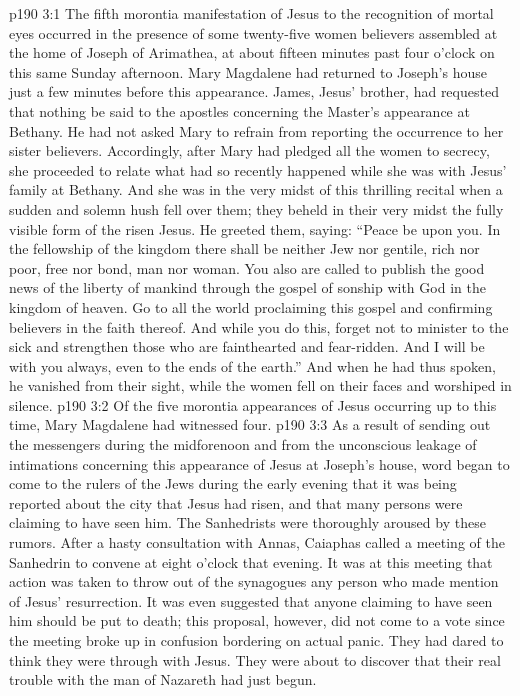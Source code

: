 \vs p190 3:1 The fifth morontia manifestation of Jesus to the recognition of mortal eyes occurred in the presence of some twenty\hyp{}five women believers assembled at the home of Joseph of Arimathea, at about fifteen minutes past four o’clock on this same Sunday afternoon. Mary Magdalene had returned to Joseph’s house just a few minutes before this appearance. James, Jesus’ brother, had requested that nothing be said to the apostles concerning the Master’s appearance at Bethany. He had not asked Mary to refrain from reporting the occurrence to her sister believers. Accordingly, after Mary had pledged all the women to secrecy, she proceeded to relate what had so recently happened while she was with Jesus’ family at Bethany. And she was in the very midst of this thrilling recital when a sudden and solemn hush fell over them; they beheld in their very midst the fully visible form of the risen Jesus. He greeted them, saying: \textcolor{ubdarkred}{“Peace be upon you. In the fellowship of the kingdom there shall be neither Jew nor gentile, rich nor poor, free nor bond, man nor woman. You also are called to publish the good news of the liberty of mankind through the gospel of sonship with God in the kingdom of heaven. Go to all the world proclaiming this gospel and confirming believers in the faith thereof. And while you do this, forget not to minister to the sick and strengthen those who are fainthearted and fear\hyp{}ridden. And I will be with you always, even to the ends of the earth.”} And when he had thus spoken, he vanished from their sight, while the women fell on their faces and worshiped in silence.
\pc \vs p190 3:2 Of the five morontia appearances of Jesus occurring up to this time, Mary Magdalene had witnessed four.
\pc \vs p190 3:3 As a result of sending out the messengers during the midforenoon and from the unconscious leakage of intimations concerning this appearance of Jesus at Joseph’s house, word began to come to the rulers of the Jews during the early evening that it was being reported about the city that Jesus had risen, and that many persons were claiming to have seen him. The Sanhedrists were thoroughly aroused by these rumors. After a hasty consultation with Annas, Caiaphas called a meeting of the Sanhedrin to convene at eight o’clock that evening. It was at this meeting that action was taken to throw out of the synagogues any person who made mention of Jesus’ resurrection. It was even suggested that anyone claiming to have seen him should be put to death; this proposal, however, did not come to a vote since the meeting broke up in confusion bordering on actual panic. They had dared to think they were through with Jesus. They were about to discover that their real trouble with the man of Nazareth had just begun.\plusone

